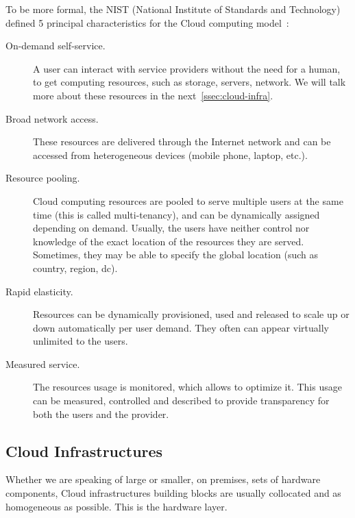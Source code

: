 To be more formal, the NIST (National Institute of Standards and
Technology) defined 5 principal characteristics for the Cloud
computing model~\cite{MG+11}:
\begin{description}
\item [On-demand self-service.] A user can interact with service
  providers without the need for a human, to get computing resources,
  such as storage, \glspl{server}, network. We will talk more about these
  resources in the next~\autoref{ssec:cloud-infra}.
\item [Broad network access.] These resources are delivered through
  the Internet network and can be accessed from heterogeneous devices
  (mobile phone, laptop, etc.).
\item [Resource pooling.] Cloud computing resources are pooled to
  serve multiple users at the same time (this is called multi-tenancy),
  and can be dynamically assigned depending on demand. Usually, the
  users have neither control nor knowledge of the exact location of
  the resources they are served. Sometimes, they may be able to
  specify the global location (such as country, region, \gls{dc}).
\item [Rapid elasticity.] Resources can be dynamically provisioned,
  used and released to scale up or down automatically per user
  demand. They often can appear virtually unlimited to the users.
\item [Measured service.] The resources usage is monitored, which
  allows to optimize it. This usage can be measured, controlled and
  described to provide transparency for both the users and the provider.
\end{description}




\subsection{Cloud Infrastructures}
\label{ssec:cloud-infra}


Whether we are speaking of large \dcs or smaller, on premises, sets of
hardware components, Cloud infrastructures building blocks are usually
collocated and as homogeneous as possible. This is the hardware layer.

